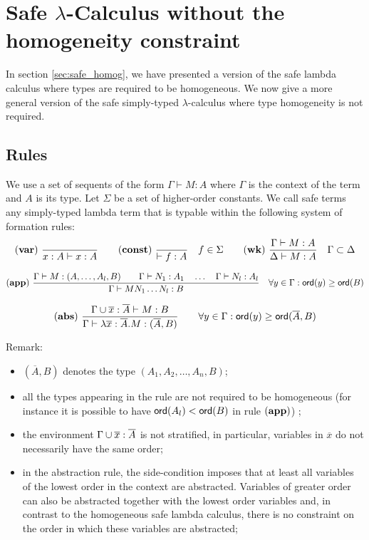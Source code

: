 \clearpage

\section{Safe $\lambda$-Calculus without the homogeneity constraint}
\label{sec:safe_nonhomog}


In section \ref{sec:safe_homog}, we have presented a version of the
safe lambda calculus where types are required to be homogeneous. We
now give a more general version of the safe simply-typed
$\lambda$-calculus where type homogeneity is not required.

\subsection{Rules}

We use a set of sequents of the form $\Gamma \vdash M : A$ where
$\Gamma$ is the context of the term and $A$ is its type. Let
$\Sigma$ be a set of higher-order constants. We call safe terms any
simply-typed lambda term that is typable within the following system
of formation rules:
$$ \mathbf{(var)} \   \frac{\displaystyle }{x : A\vdash x : A}
\qquad  \mathbf{(const)} \   \frac{\displaystyle }{\vdash f : A} \quad f \in \Sigma
\qquad  \mathbf{(wk)} \   \frac{\displaystyle \Gamma \vdash M : A}{\Delta \vdash M : A} \quad \Gamma \subset \Delta$$

$$ \mathbf{(app)} \  \frac{\displaystyle \Gamma \vdash M : (A,\ldots,A_l,B)
                                        \qquad \Gamma \vdash N_1 : A_1
                                        \quad \ldots \quad \Gamma \vdash N_l : A_l  }{\Gamma  \vdash M N_1 \ldots N_l : B}
                                    \quad
                                   \forall y \in \Gamma : {\sf ord}(y) \geq {\sf ord}(B)$$

$$ \mathbf{(abs)} \   \frac{\displaystyle \Gamma \cup \overline{x} : \overline{A} \vdash M : B}{\Gamma  \vdash \lambda \overline{x} : \overline{A} . M : (\overline{A},B)} \qquad
                                   \forall y \in \Gamma : {\sf ord}(y) \geq {\sf ord}(\overline{A},B)$$


Remark:
\begin{itemize}
\item $(\overline{A},B)$ denotes the type $(A_1,A_2, \ldots, A_n, B)$;
\item all the types appearing in the rule are not required to be homogeneous (for instance
it is possible to have ${\sf ord}(A_l) < {\sf ord}(B)$ in rule $\mathbf{(app)}$) ;
\item the environment $\Gamma \cup \overline{x}:\overline{A}$ is not stratified, in particular, variables in $\overline{x}$ do not necessarily have the same order;
\item in the abstraction rule, the side-condition imposes that at least all variables of the lowest order
in the context are abstracted. Variables of greater order can also be
abstracted together with the lowest order variables and, in contrast to
the homogeneous safe lambda calculus, there is no constraint on the
order in which these variables are abstracted;
\end{itemize}

